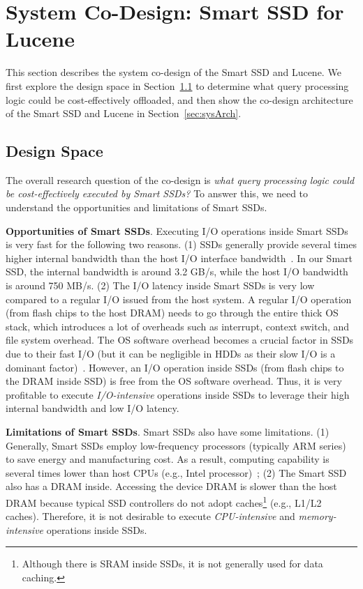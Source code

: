 
\section{System Co-Design: Smart SSD for Lucene}\label{sec:design}
This section describes the system co-design of the Smart SSD and Lucene.
We first explore the design space in Section~\ref{sec:designSpace} to determine what query processing logic could be cost-effectively offloaded, and then show the co-design architecture of the Smart SSD and Lucene in Section~\ref{sec:sysArch}.

\subsection{Design Space}\label{sec:designSpace}

The overall research question of the co-design is \emph{what query processing logic could be cost-effectively executed by Smart SSDs?} To answer this, we need to understand the opportunities and limitations of Smart SSDs. %

\textbf{Opportunities of Smart SSDs}. Executing I/O operations inside Smart SSDs is very fast for the following two reasons. (1) SSDs generally provide several times higher internal bandwidth than the host I/O interface bandwidth~\cite{Do2013QPS,De2013}. In our Smart SSD, the internal bandwidth is around 3.2 GB/s, while the host I/O bandwidth is around 750 MB/s. (2) The I/O latency inside Smart SSDs is very low compared to a regular I/O issued from the host system. A regular I/O operation (from flash chips to the host DRAM) needs to go through the entire thick OS stack, which introduces a lot of overheads such as interrupt, context switch, and file system overhead.
The OS software overhead becomes a crucial factor in SSDs due to their fast I/O (but it can be negligible in HDDs as their slow I/O is a dominant factor)~\cite{Caulfield2010}. However, an I/O operation inside SSDs (from flash chips to the DRAM inside SSD) is free from the OS software overhead. Thus, it is very profitable to execute \emph{I/O-intensive} operations inside SSDs to leverage their high internal bandwidth and low I/O latency. %

\textbf{Limitations of Smart SSDs}. Smart SSDs also have some limitations. (1) Generally, Smart SSDs employ low-frequency processors (typically ARM series) to save energy and manufacturing cost. As a result, computing capability is several times lower than host CPUs (e.g., Intel processor)~\cite{Do2013QPS,De2013}; (2) The Smart SSD also has a DRAM inside. Accessing the device DRAM is slower than the host DRAM because typical SSD controllers do not adopt caches\footnote{\small Although there is SRAM inside SSDs, it is not generally used for data caching.} (e.g., L1/L2 caches). Therefore, it is not desirable to execute \emph{CPU-intensive} and \emph{memory-intensive} operations inside SSDs. %

